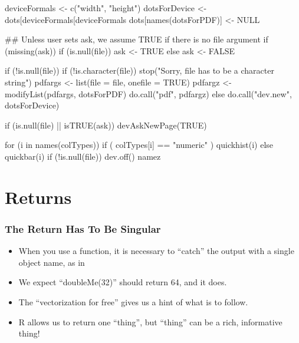 \documentclass[11pt,english]{beamer}
\begin{document}
\begin{frame}
\begin{Sinput}
{    deviceFormals <- c("width", "height")
    dotsForDevice <- dots[deviceFormals[deviceFormals %in% names(dots)]]
    dots[names(dotsForPDF)] <- NULL

     
    
    ## Unless user sets ask, we assume TRUE if there is no file argument
    if (missing(ask)) {
        if (is.null(file)) ask <- TRUE else ask <- FALSE
    }
    
    if (!is.null(file)){
        if (!is.character(file)) stop("Sorry, file has to be a character string")
        pdfargs <- list(file = file, onefile = TRUE)
        pdfargz <- modifyList(pdfargs, dotsForPDF)
        do.call("pdf", pdfargz)
    } else {
        do.call("dev.new", dotsForDevice)
    }
    
    if (is.null(file) || isTRUE(ask)) devAskNewPage(TRUE)
    
    for (i in names(colTypes)){
        if ( colTypes[i] == "numeric" ){
            quickhist(i)
        } else {
            quickbar(i)
        }
    }
    if (!is.null(file)) dev.off()
    namez
}
\end{Sinput}
  
  
  
  
\end{frame}


\section{Returns}
\begin{frame}
  \frametitle{The Return Has To Be Singular}
  \begin{itemize}
  \item When  you use a function, it is necessary to ``catch'' the
    output with a single object name, as in



  \item We expect ``doubleMe(32)'' should return 64, and it does.

  \item The ``vectorization for free'' gives us a hint of what is to follow.




\item R allows us to return one ``thing'', but ``thing'' can be a
  rich, informative thing!
\end{itemize}

\end{frame}
\end{document}
